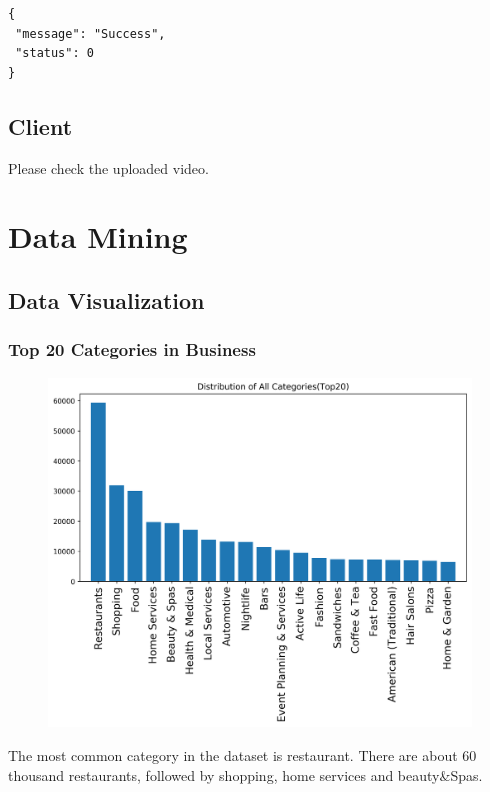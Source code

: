 \documentclass[12pt]{article}
\begin{document}
\begin{singlespacing}
\begin{lstlisting}
{
 "message": "Success",
 "status": 0
}
\end{lstlisting}
\end{singlespacing}

\subsection{Client}
Please check the uploaded video.

\section{Data Mining}\label{section-datamining}
\subsection{Data Visualization}
\subsubsection{Top 20 Categories in Business}
\begin{figure}[H]
\begin{center}
    \includegraphics[width=1.0\textwidth]{../05_dataMining/distributionAllCategories.png}
\end{center}
\end{figure}
The most common category in the dataset is restaurant. There are about 60 thousand restaurants, followed by shopping, home services and beauty\&Spas.
\end{document}
